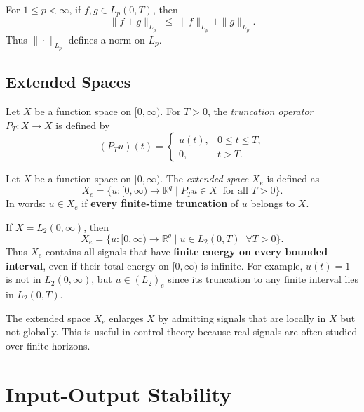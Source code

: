 \begin{proposition}
For $1 \leq p < \infty$, if $f,g \in L_p(0,T)$, then
\[
\|f+g\|_{L_p} \;\leq\; \|f\|_{L_p} + \|g\|_{L_p}.
\]
Thus $\|\cdot\|_{L_p}$ defines a norm on $L_p$.
\end{proposition}

\subsection{Extended Spaces}

\begin{definition}
Let $X$ be a function space on $[0,\infty)$.  
For $T>0$, the \emph{truncation operator} $P_T:X \to X$ is defined by
\[
(P_Tu)(t) =
\begin{cases}
u(t), & 0 \leq t \leq T,\\[6pt]
0, & t > T.
\end{cases}
\]
\end{definition}

\begin{definition}
Let $X$ be a function space on $[0,\infty)$.  
The \emph{extended space} $X_e$ is defined as
\[
X_e = \big\{ u:[0,\infty)\to\mathbb{R}^q \;\big|\; 
P_T u \in X \;\; \text{for all } T>0 \big\}.
\]
In words: $u \in X_e$ if \textbf{every finite-time truncation} of $u$ belongs to $X$.
\end{definition}

\begin{example}
If $X = L_2(0,\infty)$, then
\[
X_e = \{ u:[0,\infty)\to \mathbb{R}^q \mid u \in L_2(0,T) \;\;\forall T>0\}.
\]
Thus $X_e$ contains all signals that have \textbf{finite energy on every bounded interval}, even if their total energy on $[0,\infty)$ is infinite.  
For example, $u(t)=1$ is not in $L_2(0,\infty)$, but $u \in (L_2)_e$ since its truncation to any finite interval lies in $L_2(0,T)$.
\end{example}

\begin{remark}
The extended space $X_e$ enlarges $X$ by admitting signals that are locally in $X$ but not globally.  
This is useful in control theory because real signals are often studied over finite horizons.
\end{remark}

\section{Input-Output Stability}

